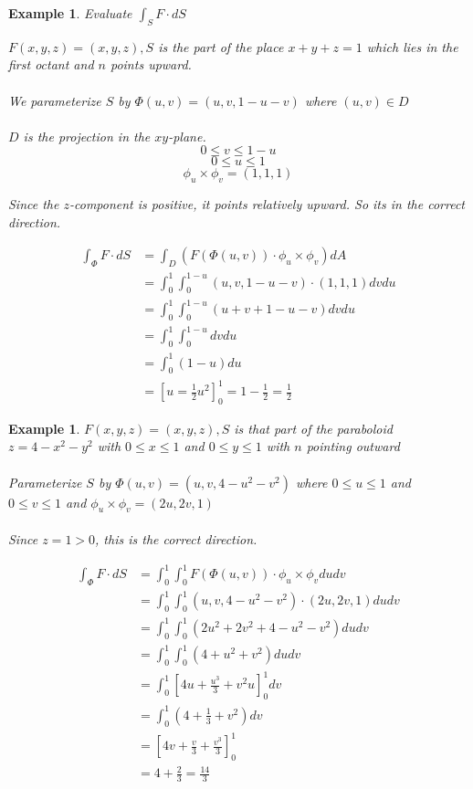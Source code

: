 \documentclass[12pt]{article}
\theoremstyle{plain}
\newtheorem{example}[theorem]{Example}
\theoremstyle{definition}
\begin{document}
\begin{example}
	Evaluate $\int_S F \cdot dS$

	$F(x,y,z) = (x,y,z), S$ is the part of the place $x+y+z=1$ which lies in the first octant and $n$ points upward.\\
	\\
	We parameterize $S$ by $\Phi (u,v) = (u,v, 1-u-v)$ where $(u,v)\in D$\\
	\\
	$D$ is the projection in the $xy$-plane.
	$$0 \leq v \leq 1-u$$
	$$0 \leq u \leq 1$$
	$$\phi_u \times \phi_v = (1,1,1)$$

	Since the $z$-component is positive, it points relatively upward. So its in the correct direction.

	\begin{align*}
		\int_\Phi F \cdot dS &= \int_D (F(\Phi (u,v)) \cdot \phi_u \times \phi_v) dA\\
		&= \int_0^1 \int_0^{1-u} (u,v,1-u-v) \cdot (1,1,1) dv du\\
		&= \int_0^1 \int_0^{1-u} (u+v+1-u-v) dv du\\
		&=\int_0^1 \int_0^{1-u} dv du\\
		&= \int_0^1 (1-u) du\\
		&= [u=\frac{1}{2}u^2]_0^1 = 1 - \frac{1}{2} = \frac{1}{2}
	\end{align*}



\end{example}

\begin{example}
	$F(x,y,z) = (x,y,z), S$ is that part of the paraboloid $z=4-x^2-y^2$ with $0 \leq x \leq 1$ and $0 \leq y \leq 1$ with $n$ pointing outward\\
	\\
	Parameterize $S$ by $\Phi (u,v) = (u,v, 4-u^2-v^2)$ where $0 \leq u \leq 1$ and $0 \leq v \leq 1$ and $\phi_u \times \phi_v = (2u, 2v, 1)$\\
	\\
	Since $z=1 > 0$, this is the correct direction.

	\begin{align*}
		\int_\Phi F \cdot dS &= \int_0^1 \int_0^1 F(\Phi (u,v)) \cdot \phi_u \times \phi_v dudv\\
		&= \int_0^1 \int_0^1 (u,v,4-u^2-v^2) \cdot (2u, 2v, 1) dudv\\
		&= \int_0^1 \int_0^1 (2u^2 + 2v^2 + 4-u^2-v^2)dudv\\
		&= \int_0^1 \int_0^1 (4+u^2+v^2) dudv\\
		&= \int_0^1 [4u+ \frac{u^3}{3} + v^2 u]^1_0 dv\\
		&= \int_0^1 (4+\frac{1}{3} + v^2)dv\\
		&=[4v + \frac{v}{3} + \frac{v^3}{3}]_0^1\\
		&= 4 + \frac{2}{3} = \frac{14}{3}
	\end{align*}

\end{example}
\end{document}
